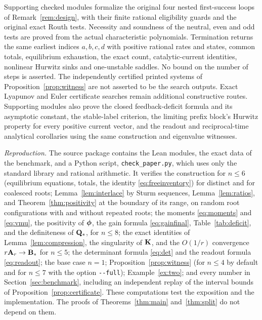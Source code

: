 Supporting checked modules formalize the original four nested first-success loops of
Remark~\ref{rem:design}, with their finite rational eligibility guards and the original
exact Routh tests. Necessity and soundness of the neutral, even and odd tests are proved
from the actual characteristic polynomials. Termination returns the same earliest
indices \(a,b,c,d\) with positive rational rates and states, common totals, equilibrium
exhaustion, the exact count, catalytic-current identities, nonlinear Hurwitz sinks and
one-unstable saddles. No bound on the number of steps is asserted. The independently
certified printed systems of Proposition~\ref{prop:witness} are not asserted to be the
search outputs. Exact Lyapunov and Euler certificate searches remain additional
constructive routes. Supporting modules also prove the closed feedback-deficit formula
and its asymptotic constant, the stable-label criterion, the limiting prefix block's
Hurwitz property for every positive current vector, and the readout and reciprocal-time
analytical corollaries using the same construction and eigenvalue witnesses.

{\sloppy\emph{Reproduction.} The source package contains the Lean modules, the exact data of
the benchmark, and a Python script, \texttt{check\_paper.py}, which uses only the standard
library and rational arithmetic. It verifies the construction for \(n\le6\) (equilibrium
equations, totals, the identity \eqref{eq:freeinventory}) for distinct and for coalesced roots;
Lemma~\ref{lem:interlace} by Sturm sequences, Lemma~\ref{lem:ratios}, and
Theorem~\ref{thm:positivity} at the boundary of its range, on random root configurations with
and without repeated roots; the moments \eqref{eq:moments} and \eqref{eq:vmu}, the positivity
of \(\boldsymbol\phi\), the gain formula \eqref{eq:gainfinal}, Table~\ref{tab:deficit}, and the
definiteness of \(\mathbf Q_*\), for \(n\le8\); the exact identities of Lemma~\ref{lem:compression},
the singularity of \(\mathbf K\), and the \(O(1/r)\) convergence \(r\mathbf A_r\to\mathbf B_*\) for \(n\le5\); the
determinant formula \eqref{eq:det} and the readout formula \eqref{eq:readout}; the base case
\(n=1\); Proposition~\ref{prop:witness} (for \(n\le4\) by default and for \(n\le7\) with the
option \texttt{-{}-full}); Example~\ref{ex:two}; and every number in
Section~\ref{sec:benchmark}, including an independent replay of the interval bounds of
Proposition~\ref{prop:certificate}. These computations test the exposition and the
implementation. The proofs of Theorems~\ref{thm:main} and~\ref{thm:split} do not depend on
them.\par}

